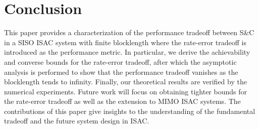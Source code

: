 \documentclass[conference,a4paper]{IEEEtran}
\begin{document}
\section{Conclusion}
This paper provides a characterization of the performance tradeoff between S\&C in a SISO ISAC system with finite blocklength where the rate-error tradeoff is introduced as the performance metric. In particular, we derive the achievability and converse bounds for the rate-error tradeoff, after which the asymptotic analysis is performed to show that the performance tradeoff vanishes as the blocklength tends to infinity. Finally, our theoretical results are verified by the numerical experiments. Future work will focus on obtaining tighter bounds for the rate-error tradeoff as well as the extension to MIMO ISAC systems. The contributions of this paper give insights to the understanding of the fundamental tradeoff and the future system design in ISAC.













%
%
%




\end{document}
